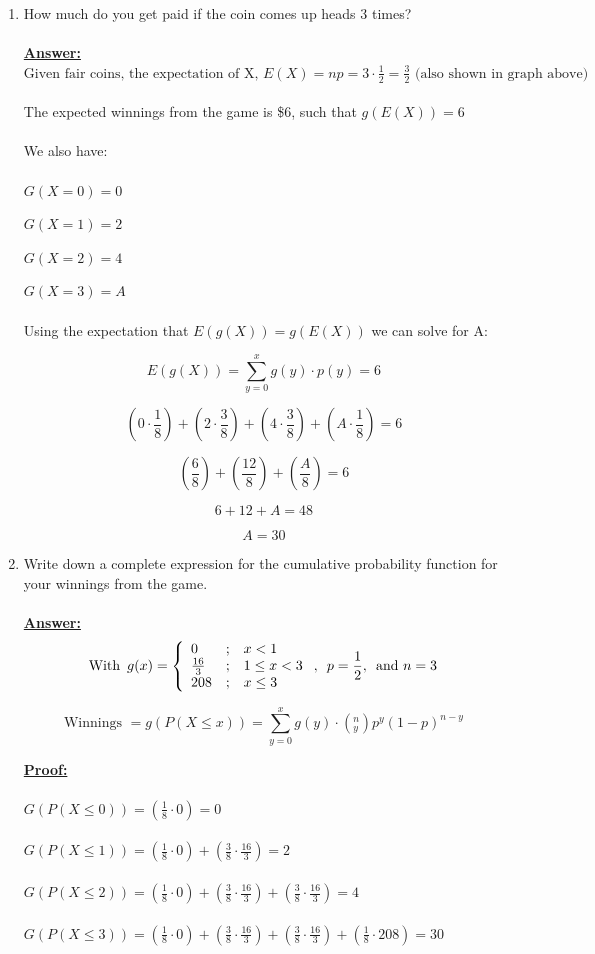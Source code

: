 \documentclass[12pt,a4paper]{article}
\numberwithin{equation}{subsection}
\begin{document}
\begin{enumerate}
\begin{enumerate}
\item How much do you get paid if the coin comes up heads 3 times?
\\
\\
\textbf{\underline{Answer:}}
\\
$\text{Given fair coins, the expectation of X, } E(X) = np = 3 \cdot \frac{1}{2} = \frac{3}{2} \text{ (also shown in graph above)}$
\\
\\
The expected winnings from the game is \$6, such that $g(E(X)) = 6$
\\
\\
We also have:
\\
\\
$G(X=0) = 0$

$G(X=1) = 2$

$G(X=2) = 4$

$G(X=3) = A$
\\
\\
Using the expectation that $E(g(X)) = g(E(X))$ we can solve for A:

$$E(g(X)) = \sum_{y=0}^x g(y) \cdot p(y) = 6$$

$$(0 \cdot \frac{1}{8}) + (2 \cdot \frac{3}{8}) + (4 \cdot \frac{3}{8}) +  (A \cdot \frac{1}{8} ) = 6$$

$$(\frac{6}{8}) + (\frac{12}{8}) + (\frac{A}{8}) = 6$$

$$6 + 12 + A = 48$$

$$A = 30$$


\item Write down a complete expression for the cumulative probability function for your winnings from the game.
\\
\\
\textbf{\underline{Answer:}}
$$\text{With} \enskip g(x) = \left\{\begin{array}{{lcl}} 0 &;& x < 1 \\  \frac{16}{3} &;& 1 \leq x < 3 \\  208 &;& x \leq 3 \end{array} \right.,\enskip  p=\frac{1}{2}, \enskip \text{and } n=3$$

$$\text{Winnings } = g(P(X \leq x)) = \sum_{y=0}^x g(y) \cdot \left(^n_y \right)p^y(1-p)^{n-y}$$

\textbf{\underline{Proof:}}
\\
\\$G(P(X \leq 0)) = (\frac{1}{8} \cdot 0) = 0$
\\
\\
$G(P(X \leq 1)) = (\frac{1}{8} \cdot 0) + (\frac{3}{8} \cdot \frac{16}{3}) = 2$
\\
\\
$G(P(X \leq 2)) = (\frac{1}{8} \cdot 0) + (\frac{3}{8} \cdot \frac{16}{3}) + (\frac{3}{8} \cdot \frac{16}{3}) = 4$
\\
\\
$G(P(X \leq 3)) = (\frac{1}{8} \cdot 0) + (\frac{3}{8} \cdot \frac{16}{3}) + (\frac{3}{8} \cdot \frac{16}{3}) + (\frac{1}{8} \cdot 208) = 30$


\end{enumerate}
\end{enumerate}
\end{document}

